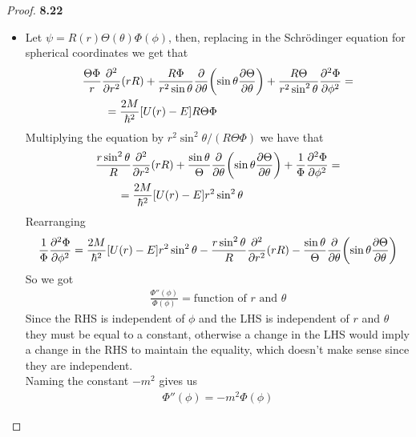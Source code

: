 \documentclass[11pt]{article}
\theoremstyle{definition}
\begin{document}
\cleardoublepage
\begin{proof}{\textbf{8.22}}
\begin{itemize}
\item [\textbf{(a)}] Let $\psi = R(r)\Theta(\theta)\Phi(\phi)$, then, replacing
in the Schrödinger equation for spherical coordinates we get that
\begin{align*}
    &\frac{\Theta\Phi}{r}\pdv[2]{r}(rR)
    + \frac{R\Phi}{r^2\sin\theta}\pdv{\theta}(\sin\theta\pdv{\Theta}{\theta})
    + \frac{R\Theta}{r^2\sin^2\theta}\pdv[2]{\Phi}{\phi} = \\
    &\qquad= \frac{2M}{\hbar^2}[U(r) - E]R\Theta\Phi
\end{align*}
Multiplying the equation by $r^2\sin^2\theta/(R\Theta\Phi)$ we have that
\begin{align*}
    &\frac{r\sin^2\theta}{R}\pdv[2]{r}(rR)
    + \frac{\sin\theta}{\Theta}\pdv{\theta}(\sin\theta\pdv{\Theta}{\theta})
    + \frac{1}{\Phi}\pdv[2]{\Phi}{\phi} = \\
    &\qquad= \frac{2M}{\hbar^2}[U(r) - E]r^2\sin^2\theta
\end{align*}
Rearranging
\begin{align*}
    \frac{1}{\Phi}\pdv[2]{\Phi}{\phi}
    = \frac{2M}{\hbar^2}[U(r) - E]r^2\sin^2\theta
    - \frac{r\sin^2\theta}{R}\pdv[2]{r}(rR)
    - \frac{\sin\theta}{\Theta}\pdv{\theta}(\sin\theta\pdv{\Theta}{\theta})
\end{align*}
So we got
\begin{align*}
    \frac{\Phi''(\phi)}{\Phi(\phi)} = \text{function of $r$ and $\theta$}
\end{align*}
Since the RHS is independent of $\phi$ and the LHS is independent of $r$ and
$\theta$ they must be equal to a constant, otherwise a change in the LHS
would imply a change in the RHS to maintain the equality, which doesn't make
sense since they are independent.
\\
Naming the constant $-m^2$ gives us
\begin{align*}
    \Phi''(\phi) = -m^2\Phi(\phi)
\end{align*}


\end{itemize}
\end{proof}
\end{document}
